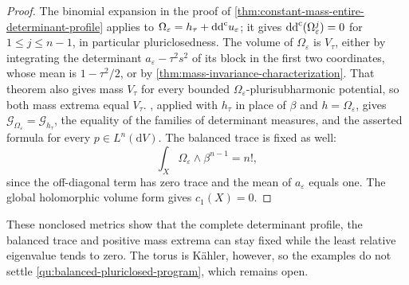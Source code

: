 \begin{proof}
The binomial expansion in the proof of \cref{thm:constant-mass-entire-determinant-profile} applies to $\Omega_\varepsilon=h_\tau+\mathrm{dd}^{\mathrm{c}} u_\varepsilon$; it gives $\mathrm{dd}^{\mathrm{c}}(\Omega_\varepsilon^j)=0$ for $1\leq j\leq n-1$, in particular pluriclosedness. The volume of $\Omega_\varepsilon$ is $V_\tau$, either by integrating the determinant $a_\varepsilon-\tau^2s^2$ of its block in the first two coordinates, whose mean is $1-\tau^2/2$, or by \cref{thm:mass-invariance-characterization}. That theorem also gives mass $V_\tau$ for every bounded $\Omega_\varepsilon$-plurisubharmonic potential, so both mass extrema equal $V_\tau$.
, applied with $h_\tau$ in place of $\beta$ and $h=\Omega_\varepsilon$, gives $\mathscr G_{\Omega_\varepsilon}=\mathscr G_{h_\tau}$, the equality of the
families of determinant measures, and the asserted formula for every
$p\in L^n(\mathrm dV)$. The balanced trace is fixed as well:
\[
 \int_X\Omega_\varepsilon\wedge\beta^{n-1}=n!,
\]
since the off-diagonal term has zero trace and the mean of
$a_\varepsilon$ equals one. The global holomorphic volume form gives
$c_1(X)=0$.
\end{proof}

These nonclosed metrics show that the complete determinant profile, the balanced trace and
positive mass extrema can stay fixed while the
least relative eigenvalue tends to zero. The torus is K\"ahler, however, so the examples do not settle
\cref{qu:balanced-pluriclosed-program}, which remains open.
